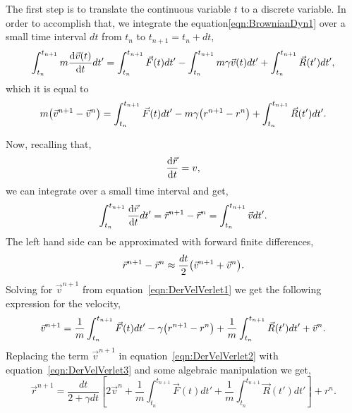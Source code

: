 The first step is to translate the continuous variable $t$ to a discrete variable.
In order to accomplish that, we integrate the equation\eqref{eqn:BrownianDyn1} over a small time interval $dt$ from $t_n$ to $t_{n+1}=t_{n}+dt$,
\begin{align}
    \int_{t_n}^{t_{n+1}}m\dv{\vec{v}(t)}{t}dt'
    =
    \int_{t_n}^{t_{n+1}}\vec{F}(t)dt'
    -\int_{t_n}^{t_{n+1}}m\gamma\vec{v}(t)dt'
    +\int_{t_n}^{t_{n+1}}\vec{R}(t')dt',
\end{align}
which it is equal to
\begin{align}
    m\qty(\vec{v}^{n+1} - \vec{v}^{n})
    =
    \int_{t_n}^{t_{n+1}}\vec{F}(t)dt'
    -m\gamma\qty(r^{n+1}-r^n)
    +\int_{t_n}^{t_{n+1}}\vec{R}(t')dt'\label{eqn:DerVelVerlet1}.
\end{align}

Now, recalling that,
\begin{gather}
    \dv{\vec{r}}{t} = v,
\end{gather}
we can integrate over a small time interval and get,
\begin{gather}
    \int_{t_n}^{t_{n+1}}\dv{\vec{r}}{t} dt' = \vec{r}^{n+1}-\vec{r}^{n} = \int_{t_n}^{t_{n+1}}\vec{v} dt'.
\end{gather}
The left hand side can be approximated with forward finite differences,
\begin{gather}
    \vec{r}^{n+1}-\vec{r}^{n} \approx \frac{dt}{2}\qty(\vec{v}^{n+1} + \vec{v}^n)\label{eqn:DerVelVerlet2}.
\end{gather}
Solving for $\vec{v}^{n+1}$ from equation~\eqref{eqn:DerVelVerlet1} we get the following expression for the velocity,
\begin{gather}
    \vec{v}^{n+1} = \frac{1}{m}\int_{t_n}^{t_{n+1}}\vec{F}(t)dt'
                     -\gamma\qty(r^{n+1}-r^n)
                     +\frac{1}{m}\int_{t_n}^{t_{n+1}}\vec{R}(t')dt'
                     +\vec{v}^{n}\label{eqn:DerVelVerlet3}.
\end{gather}
Replacing the term $\vec{v}^{n+1}$ in equation~\eqref{eqn:DerVelVerlet2} with equation~\eqref{eqn:DerVelVerlet3} and some algebraic manipulation we get,
\begin{equation}
    \vec{r}^{n+1} = \frac{dt}{2+\gamma dt}\left[ 
                        2\vec{v}^{n}                
                        +\frac{1}{m}\int_{t_n}^{t_{n+1}}\vec{F}(t)dt'
                        +\frac{1}{m}\int_{t_n}^{t_{n+1}}\vec{R}(t')dt'
                    \right]
                    +r^n\label{eqn:DerVelVerlet4}.
\end{equation}
